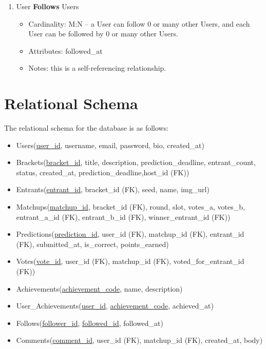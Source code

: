 \documentclass[11pt]{article}
\begin{document}
\begin{enumerate}
\begin{itemize}
        \end{itemize}
    \item User \textbf{Follows} Users
        \begin{itemize}
            \item Cardinality: M:N – a User can follow 0 or many other Users, and each User can be followed by 0 or many other Users.
            \item Attributes: followed\_at
            \item Notes: this is a self-referencing relationship.
        \end{itemize}
\end{enumerate}

\section{Relational Schema}
The relational schema for the database is as follows:
\begin{itemize}
    \item Users(\underline{user\_id}, username, email, password, bio, created\_at) \\
    \item Brackets(\underline{bracket\_id}, title, description, prediction\_deadline, entrant\_count, status, created\_at, prediction\_deadline,host\_id (FK)) \\
    \item Entrants(\underline{entrant\_id}, bracket\_id (FK), seed, name, img\_url) \\
    \item Matchups(\underline{matchup\_id}, bracket\_id (FK), round, slot, votes\_a, votes\_b, entrant\_a\_id (FK), entrant\_b\_id (FK), winner\_entrant\_id (FK)) \\
    \item Predictions(\underline{prediction\_id}, user\_id (FK), matchup\_id (FK), entrant\_id (FK), submitted\_at, is\_correct, points\_earned) \\
    \item Votes(\underline{vote\_id}, user\_id (FK), matchup\_id (FK), voted\_for\_entrant\_id (FK))
    \item Achievements(\underline{achievement\_code}, name, description)
    \item User\_Achievements(\underline{user\_id}, \underline{achievement\_code}, achieved\_at)
    \item Follows(\underline{follower\_id}, \underline{followed\_id}, followed\_at)
    \item Comments(\underline{comment\_id}, user\_id (FK), matchup\_id (FK), created\_at, body)
\end{itemize}
\end{document}

